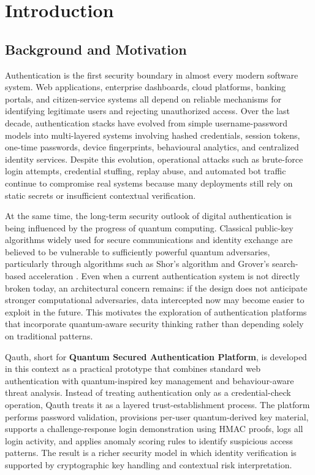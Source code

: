 \chapter{Introduction}

\section{Background and Motivation}
Authentication is the first security boundary in almost every modern software system. Web applications, enterprise dashboards, cloud platforms, banking portals, and citizen-service systems all depend on reliable mechanisms for identifying legitimate users and rejecting unauthorized access. Over the last decade, authentication stacks have evolved from simple username-password models into multi-layered systems involving hashed credentials, session tokens, one-time passwords, device fingerprints, behavioural analytics, and centralized identity services. Despite this evolution, operational attacks such as brute-force login attempts, credential stuffing, replay abuse, and automated bot traffic continue to compromise real systems because many deployments still rely on static secrets or insufficient contextual verification.

At the same time, the long-term security outlook of digital authentication is being influenced by the progress of quantum computing. Classical public-key algorithms widely used for secure communications and identity exchange are believed to be vulnerable to sufficiently powerful quantum adversaries, particularly through algorithms such as Shor's algorithm and Grover's search-based acceleration \cite{shor1994,grover1996}. Even when a current authentication system is not directly broken today, an architectural concern remains: if the design does not anticipate stronger computational adversaries, data intercepted now may become easier to exploit in the future. This motivates the exploration of authentication platforms that incorporate quantum-aware security thinking rather than depending solely on traditional patterns.

Qauth, short for \textbf{Quantum Secured Authentication Platform}, is developed in this context as a practical prototype that combines standard web authentication with quantum-inspired key management and behaviour-aware threat analysis. Instead of treating authentication only as a credential-check operation, Qauth treats it as a layered trust-establishment process. The platform performs password validation, provisions per-user quantum-derived key material, supports a challenge-response login demonstration using HMAC proofs, logs all login activity, and applies anomaly scoring rules to identify suspicious access patterns. The result is a richer security model in which identity verification is supported by cryptographic key handling and contextual risk interpretation.

